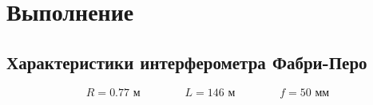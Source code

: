 \documentclass[a4paper,12pt]{article}
\theoremstyle{definition}
\begin{document}
\begin{figure}[H]
	\begin{minipage}[h]{0.23\linewidth}
	\end{minipage}
\end{figure}

\section{Выполнение}
\subsection{Характеристики интерферометра Фабри-Перо}
$$R = 0.77 \text{ м} \qquad \qquad L = 146 \text{ м} \qquad \qquad f = 50 \text{ мм}$$
\end{document}
